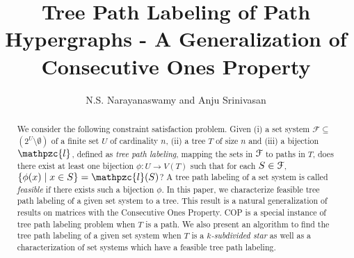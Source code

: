\documentclass[a4paper,UKenglish,numberwithinsect]{lipics}
\def\cF{{\cal F}}
\def\F{{\mathcal F}}
\def\cl{\mathpzc{l}}
\begin{document}
\title{Tree Path Labeling of Path Hypergraphs - A Generalization of
  Consecutive Ones Property}

\author[1]{N.S. Narayanaswamy and Anju Srinivasan}





\maketitle


\begin{abstract}
  We consider the following constraint satisfaction problem. Given (i)
  a set system $\F \subseteq$ $(2^{U} \setminus \emptyset)$ of a finite
  set $U$ of cardinality $n$, (ii) a tree $T$ of size $n$ and (iii) a
  bijection $\cl$, defined as {\em tree path labeling}, mapping the
  sets in $\cF$ to paths in $T$, does there exist at least one
  bijection $\phi:U \rightarrow V(T)$ such that for each $S \in \cF$,
  $\{\phi(x) \mid x \in S\} = \cl(S)$?  A tree path labeling of a set
  system is called {\em feasible} if there exists such a bijection
  $\phi$.  In this paper, we characterize feasible tree path labeling
  of a given set system to a tree.  This result is a natural
  generalization of results on matrices with the Consecutive Ones
  Property. COP is a special instance of tree path labeling problem
  when $T$ is a path.  We also present an algorithm to find the tree
  path labeling of a given set system when $T$ is a {\em
    $k$-subdivided star} as well as a characterization of set systems
  which have a feasible tree path labeling.
\end{abstract}
\end{document}
